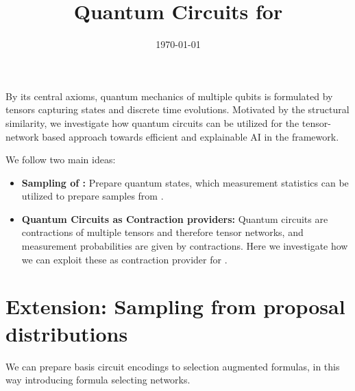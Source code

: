 \documentclass[aps,onecolumn,nofootinbib,pra]{article}
\begin{document}
    \title{Quantum Circuits for \tnreason{}}

    \maketitle
    \date{\today}

    By its central axioms, quantum mechanics of multiple qubits is formulated by tensors capturing states and discrete time evolutions.
    Motivated by the structural similarity, we investigate how quantum circuits can be utilized for the tensor-network based approach towards efficient and explainable AI in the \tnreason{} framework.

    We follow two main ideas:
    \begin{itemize}
        \item \textbf{Sampling of \ComputationActivationNetworks{}:} Prepare quantum states, which measurement statistics can be utilized to prepare samples from \ComputationActivationNetworks{}.
        \item \textbf{Quantum Circuits as Contraction providers:} Quantum circuits are contractions of multiple tensors and therefore tensor networks, and measurement probabilities are given by contractions.
        Here we investigate how we can exploit these as contraction provider for \tnreason{}.
    \end{itemize}

    \tableofcontents
    
    

    

    

    \appendix


    \section{Extension: Sampling from proposal distributions}

    We can prepare basis circuit encodings to selection augmented formulas, in this way introducing formula selecting networks.
\end{document}
